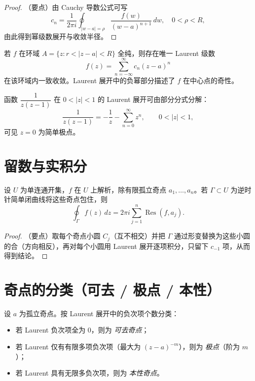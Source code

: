 \documentclass[lang=cn,10pt]{elegantbook}
\begin{document}
	\begin{proof}
		（要点）由 Cauchy 导数公式可写
		\[
		c_n=\frac{1}{2\pi i}\oint_{|w-a|=\rho}\frac{f(w)}{(w-a)^{n+1}}\,dw,\quad 0<\rho<R,
		\]
		由此得到幂级数展开与收敛半径。
	\end{proof}
	
	\begin{definition}[Laurent 展开]
		若 \(f\) 在环域 \(A=\{z: r<|z-a|<R\}\) 全纯，则存在唯一 Laurent 级数
		\[
		f(z)=\sum_{n=-\infty}^\infty c_n (z-a)^n
		\]
		在该环域内一致收敛。Laurent 展开中的负幂部分描述了 \(f\) 在中心点的奇性。
	\end{definition}
	
	\begin{example}
		函数 \(\dfrac{1}{z(z-1)}\) 在 \(0<|z|<1\) 的 Laurent 展开可由部分分式分解：
		\[
		\frac{1}{z(z-1)}=-\frac{1}{z} - \sum_{n=0}^\infty z^n,\qquad 0<|z|<1,
		\]
		可见 \(z=0\) 为简单极点。
	\end{example}
	
	\section{留数与实积分}
	
	\begin{definition}[留数定理]
		设 \(U\) 为单连通开集，\(f\) 在 \(U\) 上解析，除有限孤立奇点 \(a_1,\dots,a_n\)。若 \(\Gamma\subset U\) 为逆时针简单闭曲线将这些奇点包住，则
		\[
		\oint_\Gamma f(z)\,dz = 2\pi i\sum_{j=1}^n \operatorname{Res}(f,a_j).
		\]
	\end{definition}
	
	\begin{proof}
		（要点）取每个奇点小圆 \(C_j\)（互不相交）并把 \(\Gamma\) 通过形变替换为这些小圆的合（方向相反），再对每个小圆用 Laurent 展开逐项积分，只留下 \(c_{-1}\) 项，从而得到结论。
	\end{proof}
	
	
	\section{奇点的分类（可去 / 极点 / 本性）}
	
	\begin{theorem}[孤立奇点的分类（定义）]
		设 \(a\) 为孤立奇点。按 Laurent 展开中的负次项个数分类：
		\begin{itemize}
			\item 若 Laurent 负次项全为 0，则为 \emph{可去奇点}；
			\item 若 Laurent 仅有有限多项负次项（最大为 \((z-a)^{-m}\)），则为 \emph{极点}（阶为 \(m\)）；
			\item 若 Laurent 具有无限多负次项，则为 \emph{本性奇点}。
		\end{itemize}
	\end{theorem}
	
\end{document}
